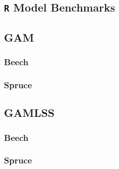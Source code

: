 \begin{landscape}

  \section{\texttt{R} Model Benchmarks}


  \subsection{GAM}
  \subsubsection{Beech}
  
  \subsubsection{Spruce}
  

  \subsection{GAMLSS}
  \subsubsection{Beech}
  
  \subsubsection{Spruce}
  

\end{landscape}

